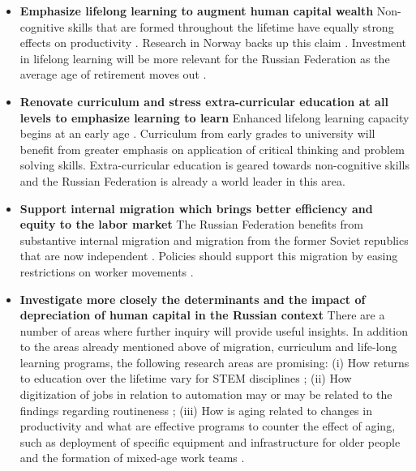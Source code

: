 \documentclass[alpha-refs]{wiley-article-02b}
\begin{document}
\begin{itemize}

\item  \textbf{Emphasize lifelong learning to augment human 
capital 
wealth} Non-cognitive skills that are 
formed throughout the lifetime have equally strong effects on productivity  
\parencite{kautz2014}. Research in Norway backs up this claim 
\parencite{midtsundstad2019}. Investment in lifelong learning will be more 
relevant for the Russian Federation as the average age of retirement moves 
out \parencite{kilpi2012, paccagnella2016}.
 

\item \textbf{Renovate curriculum and stress extra-curricular education at 
all levels to emphasize 
learning to learn} Enhanced lifelong learning capacity begins at an early 
age \parencite{kautz2014}. Curriculum from early grades to university will 
benefit from greater emphasis on application of critical thinking and 
problem solving skills. Extra-curricular education is geared towards 
non-cognitive skills and the Russian Federation is already a world leader 
in this area. 

\item  \textbf{Support internal migration which brings better efficiency 
and equity to the labor market} The Russian Federation benefits from 
substantive internal migration and migration from the former Soviet 
republics that are now independent \parencite{tarasyev2018}. Policies 
should support this migration by easing restrictions on worker movements 
\parencite{oshchepkov2015}. 

\item \textbf{Investigate more closely the determinants and the impact of 
depreciation of human capital in the Russian context} There are a number of 
areas where further inquiry will provide useful insights. In addition to 
the areas already mentioned above of migration, curriculum and life-long 
learning programs, the following research areas are promising: (i) How 
returns to education over the lifetime vary for STEM disciplines 
\parencite{deming2018}; (ii) How digitization of jobs in relation to 
automation may or may be related to the findings regarding routineness 
\parencite{evangelista2014,cirillo2019}; (iii) How is aging related to 
changes in productivity and what are effective programs to counter the 
effect of aging, such as deployment of specific equipment and 
infrastructure for older people and the formation of mixed-age work teams 
\parencite{gobel2009,gobel2013}.

\end{itemize}
\end{document}
